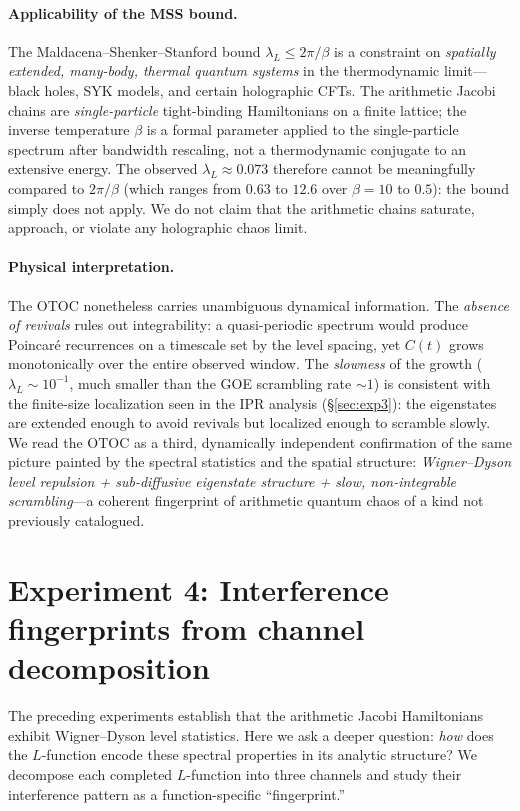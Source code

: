\documentclass[aps,prx,reprint,floatfix]{revtex4-2}
\begin{document}
\paragraph{Applicability of the MSS bound.}
The Maldacena--Shenker--Stanford bound $\lambda_L\le 2\pi/\beta$ is a
constraint on \emph{spatially extended, many-body, thermal quantum systems}
in the thermodynamic limit---black holes, SYK models, and certain holographic
CFTs. The arithmetic Jacobi chains are \emph{single-particle} tight-binding
Hamiltonians on a finite lattice; the inverse temperature $\beta$ is a
formal parameter applied to the single-particle spectrum after bandwidth
rescaling, not a thermodynamic conjugate to an extensive energy. The
observed $\lambda_L\approx 0.073$ therefore cannot be meaningfully compared
to $2\pi/\beta$ (which ranges from $0.63$ to $12.6$ over $\beta=10$ to
$0.5$): the bound simply does not apply. We do not claim that the arithmetic
chains saturate, approach, or violate any holographic chaos limit.

\paragraph{Physical interpretation.}
The OTOC nonetheless carries unambiguous dynamical information. The
\emph{absence of revivals} rules out integrability: a quasi-periodic
spectrum would produce Poincar\'e recurrences on a timescale set by the
level spacing, yet $C(t)$ grows monotonically over the entire observed
window. The \emph{slowness} of the growth ($\lambda_L\sim 10^{-1}$, much
smaller than the GOE scrambling rate $\sim 1$) is consistent with the
finite-size localization seen in the IPR analysis (\S\ref{sec:exp3}): the
eigenstates are extended enough to avoid revivals but localized enough to
scramble slowly. We read the OTOC as a third, dynamically independent
confirmation of the same picture painted by the spectral statistics and the
spatial structure: \emph{Wigner--Dyson level repulsion + sub-diffusive
eigenstate structure + slow, non-integrable scrambling}---a coherent
fingerprint of arithmetic quantum chaos of a kind not previously catalogued.

\section{Experiment 4: Interference fingerprints from channel decomposition}
\label{sec:exp4}

The preceding experiments establish that the arithmetic Jacobi Hamiltonians
exhibit Wigner--Dyson level statistics.  Here we ask a deeper question:
\emph{how} does the $L$-function encode these spectral properties in its
analytic structure?  We decompose each completed $L$-function into three
channels and study their interference pattern as a function-specific
``fingerprint.''
\end{document}
